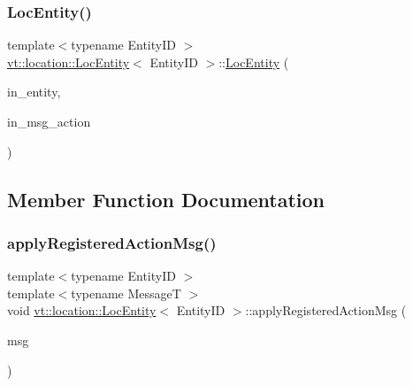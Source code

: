 \subsubsection{\texorpdfstring{Loc\+Entity()}{LocEntity()}}
{\footnotesize\ttfamily template$<$typename Entity\+ID $>$ \\
\hyperlink{structvt_1_1location_1_1_loc_entity}{vt\+::location\+::\+Loc\+Entity}$<$ Entity\+ID $>$\+::\hyperlink{structvt_1_1location_1_1_loc_entity}{Loc\+Entity} (\begin{DoxyParamCaption}\item[{Entity\+ID const \&}]{in\+\_\+entity,  }\item[{\hyperlink{namespacevt_1_1location_ad0a130e4d79e745543925240e13e8f08}{Loc\+Msg\+Action\+Type}}]{in\+\_\+msg\+\_\+action }\end{DoxyParamCaption})\hspace{0.3cm}{\ttfamily [inline]}}



\subsection{Member Function Documentation}
\mbox{\label{structvt_1_1location_1_1_loc_entity_a7675dd0ee13bc5b759b6a4313d521e04}} 
\subsubsection{\texorpdfstring{apply\+Registered\+Action\+Msg()}{applyRegisteredActionMsg()}}
{\footnotesize\ttfamily template$<$typename Entity\+ID $>$ \\
template$<$typename MessageT $>$ \\
void \hyperlink{structvt_1_1location_1_1_loc_entity}{vt\+::location\+::\+Loc\+Entity}$<$ Entity\+ID $>$\+::apply\+Registered\+Action\+Msg (\begin{DoxyParamCaption}\item[{MessageT $\ast$}]{msg }\end{DoxyParamCaption})\hspace{0.3cm}{\ttfamily [inline]}}



